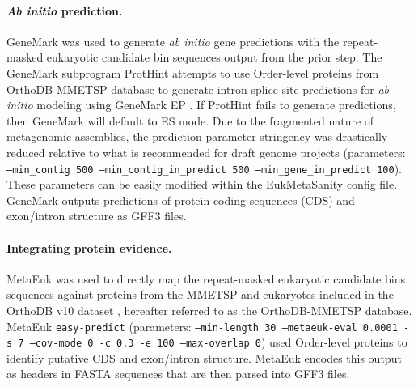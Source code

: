 \documentclass[12pt]{article}
\numberwithin{equation}{section}
\begin{document}
\paragraph{\textit{Ab initio} prediction.}  GeneMark  \citep{Lomsadze2005} was used to generate \textit{ab initio} gene predictions with the repeat-masked eukaryotic candidate bin sequences output from the prior step. The GeneMark subprogram ProtHint attempts to use Order-level proteins from OrthoDB-MMETSP database to generate intron splice-site predictions for \textit{ab initio} modeling using GeneMark EP  \citep{Bruna2020}. If ProtHint fails to generate predictions, then GeneMark will default to ES mode. Due to the fragmented nature of metagenomic assemblies, the prediction parameter stringency was drastically reduced relative to what is recommended for draft genome projects (parameters: \texttt{--min\_contig 500 --min\_contig\_in\_predict 500 --min\_gene\_in\_predict 100}). These parameters can be easily modified within the EukMetaSanity config file. GeneMark outputs predictions of protein coding sequences (CDS) and exon/intron structure as GFF3 files. 


\paragraph{Integrating protein evidence.} MetaEuk \citep{LevyKarin2020} was used to directly map the repeat-masked eukaryotic candidate bins sequences against proteins from the MMETSP \citep{Keeling2014, Johnson2018Re-assembly} and eukaryotes included in the OrthoDB v10 dataset \citep{Kriventseva2018}, hereafter referred to as the OrthoDB-MMETSP database. MetaEuk \texttt{easy-predict} (parameters: \texttt{--min-length 30 --metaeuk-eval 0.0001 -s 7 --cov-mode 0 -c 0.3 -e 100 --max-overlap 0}) used Order-level proteins to identify putative CDS and exon/intron structure. MetaEuk encodes this output as headers in FASTA sequences that are then parsed into GFF3 files. 
\end{document}
